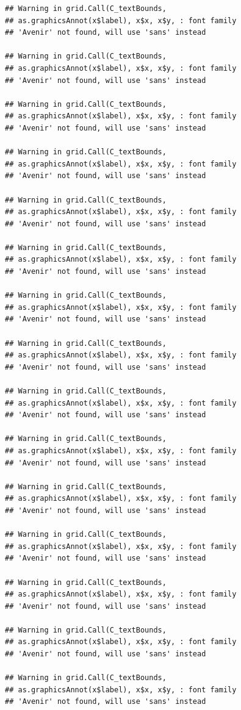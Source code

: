 \documentclass[]{krantz}
\begin{document}
\begin{verbatim}
## Warning in grid.Call(C_textBounds,
## as.graphicsAnnot(x$label), x$x, x$y, : font family
## 'Avenir' not found, will use 'sans' instead

## Warning in grid.Call(C_textBounds,
## as.graphicsAnnot(x$label), x$x, x$y, : font family
## 'Avenir' not found, will use 'sans' instead

## Warning in grid.Call(C_textBounds,
## as.graphicsAnnot(x$label), x$x, x$y, : font family
## 'Avenir' not found, will use 'sans' instead

## Warning in grid.Call(C_textBounds,
## as.graphicsAnnot(x$label), x$x, x$y, : font family
## 'Avenir' not found, will use 'sans' instead

## Warning in grid.Call(C_textBounds,
## as.graphicsAnnot(x$label), x$x, x$y, : font family
## 'Avenir' not found, will use 'sans' instead

## Warning in grid.Call(C_textBounds,
## as.graphicsAnnot(x$label), x$x, x$y, : font family
## 'Avenir' not found, will use 'sans' instead

## Warning in grid.Call(C_textBounds,
## as.graphicsAnnot(x$label), x$x, x$y, : font family
## 'Avenir' not found, will use 'sans' instead

## Warning in grid.Call(C_textBounds,
## as.graphicsAnnot(x$label), x$x, x$y, : font family
## 'Avenir' not found, will use 'sans' instead

## Warning in grid.Call(C_textBounds,
## as.graphicsAnnot(x$label), x$x, x$y, : font family
## 'Avenir' not found, will use 'sans' instead

## Warning in grid.Call(C_textBounds,
## as.graphicsAnnot(x$label), x$x, x$y, : font family
## 'Avenir' not found, will use 'sans' instead

## Warning in grid.Call(C_textBounds,
## as.graphicsAnnot(x$label), x$x, x$y, : font family
## 'Avenir' not found, will use 'sans' instead

## Warning in grid.Call(C_textBounds,
## as.graphicsAnnot(x$label), x$x, x$y, : font family
## 'Avenir' not found, will use 'sans' instead

## Warning in grid.Call(C_textBounds,
## as.graphicsAnnot(x$label), x$x, x$y, : font family
## 'Avenir' not found, will use 'sans' instead

## Warning in grid.Call(C_textBounds,
## as.graphicsAnnot(x$label), x$x, x$y, : font family
## 'Avenir' not found, will use 'sans' instead

## Warning in grid.Call(C_textBounds,
## as.graphicsAnnot(x$label), x$x, x$y, : font family
## 'Avenir' not found, will use 'sans' instead


\end{verbatim}
\end{document}

